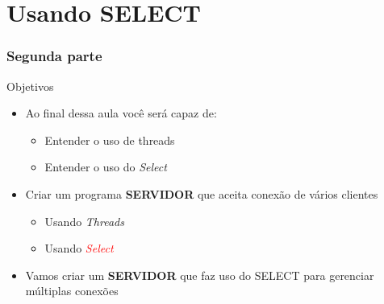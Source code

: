 \documentclass[10pt, xcolor=x11names]{beamer}
\begin{document}
\section{Usando SELECT}
\begin{frame} \frametitle{Segunda parte}
	\begin{block}{Objetivos}
		\begin{itemize}
			\item Ao final dessa aula você será capaz de:
			\begin{itemize}
				\item Entender o uso de threads
				\item Entender o uso do \textit{Select}
			\end{itemize}
			\item Criar um programa \textbf{SERVIDOR} que aceita conexão de vários clientes
			\begin{itemize}
				\item Usando \textit{Threads}
				\item Usando \textcolor<2->{red}{\textit{Select}}
			\end{itemize}
		\end{itemize}
		\begin{itemize}
			\item<2-> Vamos criar um \textbf{SERVIDOR} que faz uso do SELECT para gerenciar múltiplas conexões
		\end{itemize}
	\end{block}
\end{frame}
\end{document}
